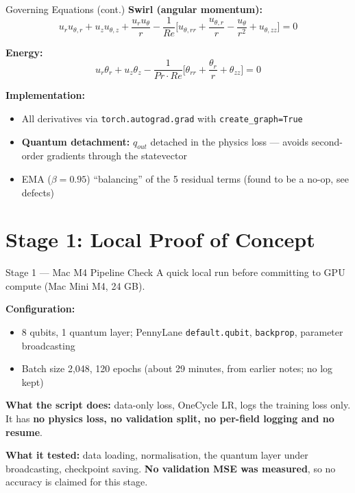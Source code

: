 \documentclass[aspectratio=169]{beamer}
\begin{document}
\begin{frame}{Governing Equations (cont.)}
\textbf{Swirl (angular momentum):}
\[ u_r u_{\theta,r} + u_z u_{\theta,z} + \frac{u_r u_\theta}{r} - \frac{1}{Re}\Big[u_{\theta,rr} + \frac{u_{\theta,r}}{r} - \frac{u_\theta}{r^2} + u_{\theta,zz}\Big] = 0 \]

\textbf{Energy:}
\[ u_r \theta_r + u_z \theta_z - \frac{1}{Pr \cdot Re}\Big[\theta_{rr} + \frac{\theta_r}{r} + \theta_{zz}\Big] = 0 \]

\vspace{0.3cm}
\textbf{Implementation:}
\begin{itemize}
  \item All derivatives via \texttt{torch.autograd.grad} with \texttt{create\_graph=True}
  \item \textbf{Quantum detachment:} $q_{out}$ detached in the physics loss --- avoids second-order gradients through the statevector
  \item EMA ($\beta=0.95$) ``balancing'' of the 5 residual terms (found to be a no-op, see defects)
\end{itemize}
\end{frame}

\section{Stage 1: Local Proof of Concept}

\begin{frame}{Stage 1 --- Mac M4 Pipeline Check}
A quick local run before committing to GPU compute (Mac Mini M4, 24 GB).

\vspace{0.2cm}
\textbf{Configuration:}
\begin{itemize}
  \item 8 qubits, 1 quantum layer; PennyLane \texttt{default.qubit}, \texttt{backprop}, parameter broadcasting
  \item Batch size 2,048, 120 epochs (about 29 minutes, from earlier notes; no log kept)
\end{itemize}

\vspace{0.2cm}
\textbf{What the script does:} data-only loss, OneCycle LR, logs the training loss only.
It has \textbf{no physics loss, no validation split, no per-field logging and no resume}.

\vspace{0.2cm}
\textbf{What it tested:} data loading, normalisation, the quantum layer under broadcasting, checkpoint saving.
\textbf{No validation MSE was measured}, so no accuracy is claimed for this stage.
\end{frame}
\end{document}
